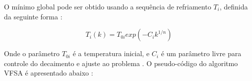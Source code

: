 O mínimo global pode ser obtido usando a sequência de refriamento $T_i$, definida da seguinte forma \cite{ingber}:

\begin{equation}
\label{eq:3.8}
 T_i(k)=T_{0i}exp(-C_ik^{1/n})
\end{equation}

Onde o parâmetro $T_{0i}$ é a temperatura inicial, e $C_i$ é um parâmetro livre para controle do decaimento e ajuste ao
problema \cite{klaus}. O pseudo-código do algoritmo VFSA é apresentado abaixo \cite{stoffa}:

\vspace{\onelineskip} 




